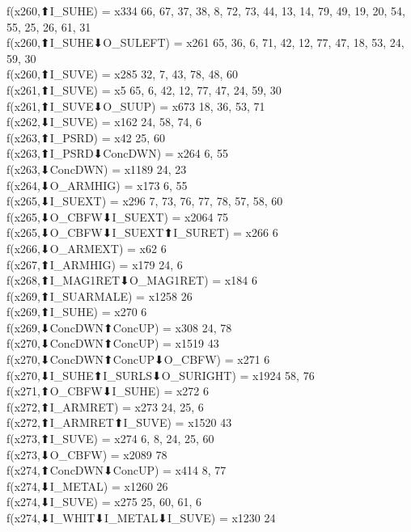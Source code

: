 f(x260,⬆I_SUHE) = x334 {66, 67, 37, 38, 8, 72, 73, 44, 13, 14, 79, 49, 19, 20, 54, 55, 25, 26, 61, 31} \\
f(x260,⬆I_SUHE⬇O_SULEFT) = x261 {65, 36, 6, 71, 42, 12, 77, 47, 18, 53, 24, 59, 30} \\
f(x260,⬆I_SUVE) = x285 {32, 7, 43, 78, 48, 60} \\
f(x261,⬆I_SUVE) = x5 {65, 6, 42, 12, 77, 47, 24, 59, 30} \\
f(x261,⬆I_SUVE⬇O_SUUP) = x673 {18, 36, 53, 71} \\
f(x262,⬇I_SUVE) = x162 {24, 58, 74, 6} \\
f(x263,⬆I_PSRD) = x42 {25, 60} \\
f(x263,⬆I_PSRD⬇ConcDWN) = x264 {6, 55} \\
f(x263,⬇ConcDWN) = x1189 {24, 23} \\
f(x264,⬇O_ARMHIG) = x173 {6, 55} \\
f(x265,⬇I_SUEXT) = x296 {7, 73, 76, 77, 78, 57, 58, 60} \\
f(x265,⬇O_CBFW⬇I_SUEXT) = x2064 {75} \\
f(x265,⬇O_CBFW⬇I_SUEXT⬆I_SURET) = x266 {6} \\
f(x266,⬇O_ARMEXT) = x62 {6} \\
f(x267,⬆I_ARMHIG) = x179 {24, 6} \\
f(x268,⬆I_MAG1RET⬇O_MAG1RET) = x184 {6} \\
f(x269,⬆I_SUARMALE) = x1258 {26} \\
f(x269,⬆I_SUHE) = x270 {6} \\
f(x269,⬇ConcDWN⬆ConcUP) = x308 {24, 78} \\
f(x270,⬇ConcDWN⬆ConcUP) = x1519 {43} \\
f(x270,⬇ConcDWN⬆ConcUP⬇O_CBFW) = x271 {6} \\
f(x270,⬇I_SUHE⬆I_SURLS⬇O_SURIGHT) = x1924 {58, 76} \\
f(x271,⬆O_CBFW⬇I_SUHE) = x272 {6} \\
f(x272,⬆I_ARMRET) = x273 {24, 25, 6} \\
f(x272,⬆I_ARMRET⬆I_SUVE) = x1520 {43} \\
f(x273,⬆I_SUVE) = x274 {6, 8, 24, 25, 60} \\
f(x273,⬇O_CBFW) = x2089 {78} \\
f(x274,⬆ConcDWN⬇ConcUP) = x414 {8, 77} \\
f(x274,⬇I_METAL) = x1260 {26} \\
f(x274,⬇I_SUVE) = x275 {25, 60, 61, 6} \\
f(x274,⬇I_WHIT⬇I_METAL⬇I_SUVE) = x1230 {24} \\
